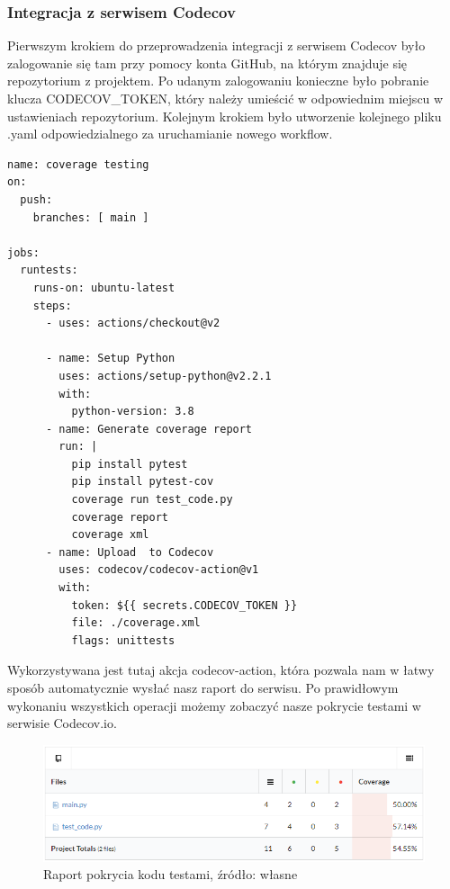 \subsubsection{Integracja z serwisem Codecov}
Pierwszym krokiem do przeprowadzenia integracji z serwisem Codecov było zalogowanie się tam przy pomocy konta GitHub, na którym znajduje się repozytorium z projektem. Po udanym zalogowaniu konieczne było pobranie klucza CODECOV\_TOKEN, który należy umieścić w odpowiednim miejscu w ustawieniach repozytorium. Kolejnym krokiem było utworzenie kolejnego pliku .yaml odpowiedzialnego za uruchamianie nowego workflow. 

\begin{lstlisting}[caption={plik coverage.yaml zawierający workflow automatycznie sprawdzający pokrycie testami}]
name: coverage testing
on:
  push:
    branches: [ main ]
    
jobs:
  runtests:
    runs-on: ubuntu-latest
    steps:
      - uses: actions/checkout@v2

      - name: Setup Python
        uses: actions/setup-python@v2.2.1
        with: 
          python-version: 3.8 
      - name: Generate coverage report
        run: |
          pip install pytest
          pip install pytest-cov
          coverage run test_code.py
          coverage report
          coverage xml
      - name: Upload  to Codecov
        uses: codecov/codecov-action@v1
        with:
          token: ${{ secrets.CODECOV_TOKEN }}
          file: ./coverage.xml
          flags: unittests
\end{lstlisting}

Wykorzystywana jest tutaj akcja codecov-action, która pozwala nam w łatwy sposób automatycznie wysłać nasz raport do serwisu. Po prawidłowym wykonaniu wszystkich operacji możemy zobaczyć nasze pokrycie testami w serwisie Codecov.io. 

\begin{figure}[htbp]
    \centering
    \includegraphics[width=12cm]{images/testingCI6.png}
    \caption{Raport pokrycia kodu testami, źródło: własne}
    \label{fig:ci6}
\end{figure}

